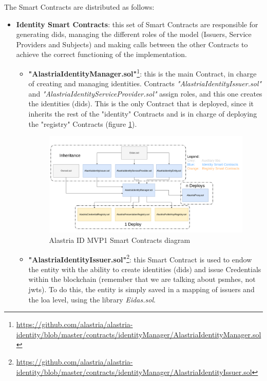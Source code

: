 \documentclass[a4paper, 12pt]{article} %
\begin{document}
            The Smart Contracts are distributed as follows:
            \begin{itemize}
                \item \textbf{Identity Smart Contracts}: this set of Smart Contracts are responsible for generating \acrshort{did}s, managing the different roles of the model (Issuers, Service Providers and Subjects) and making calls between the other Contracts to achieve the correct functioning of the implementation.
                \begin{itemize}
                    \item \textbf{"AlastriaIdentityManager.sol"}\footnote{\url{https://github.com/alastria/alastria-identity/blob/master/contracts/identityManager/AlastriaIdentityManager.sol}}: this is the main Contract, in charge of creating and managing identities. Contracts \textit{"AlastriaIdentityIssuer.sol"} and \textit{"AlastriaIdentityServiceProvider.sol"} assign roles, and this one creates the identities (\acrshort{did}s). This is the only Contract that is deployed, since it inherits the rest of the "identity" Contracts and is in charge of deploying the "registry" Contracts (figure \ref{fig:mvp1-contracts}).
                    \begin{figure}[h]
                        \centering
                        \includegraphics[width=1.1\textwidth]{SCs-Diagram.png}
                        \caption{Alastria ID MVP1 Smart Contracts diagram}
                        \label{fig:mvp1-contracts}
                    \end{figure}
                    \item \textbf{"AlastriaIdentityIssuer.sol"}\footnote{\url{https://github.com/alastria/alastria-identity/blob/master/contracts/identityManager/AlastriaIdentityIssuer.sol}}: this Smart Contract is used to endow the entity with the ability to create identities (\acrshort{did}s) and issue Credentials within the blockchain (remember that we are talking about \acrshort{psmh}es, not \acrshort{jwt}s). To do this, the entity is simply saved in a mapping of issuers and the \acrshort{loa} level, using the library \textit{Eidas.sol}.

\end{itemize}
\end{itemize}
\end{document}
